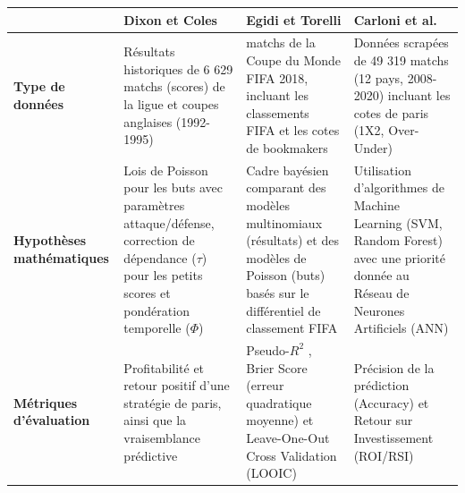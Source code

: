 \begin{landscape}

\begin{tabular}{|L{2cm}||C{5cm}|C{5cm}|C{5cm}|} 
    \hline  & \textbf{Dixon et Coles} &  \textbf{Egidi et Torelli} &  \textbf{Carloni et al.}  \\
    \hline \textbf{Type de données} & Résultats historiques de 6 629 matchs (scores) de la ligue et coupes anglaises (1992-1995) 
    & matchs de la Coupe du Monde FIFA 2018, incluant les classements FIFA et les cotes de bookmakers
    & Données scrapées de 49 319 matchs (12 pays, 2008-2020) incluant les cotes de paris (1X2, Over-Under) \\
    \hline \textbf{Hypothèses mathématiques} & Lois de Poisson pour les buts avec paramètres attaque/défense, 
    correction de dépendance ($\tau$) pour les petits scores et pondération temporelle ($\Phi$)
    & Cadre bayésien comparant des modèles multinomiaux (résultats) et des modèles de Poisson (buts) basés sur le différentiel de classement FIFA
    & Utilisation d'algorithmes de Machine Learning (SVM, Random Forest) avec une priorité donnée au Réseau de Neurones Artificiels (ANN) \\
    \hline \textbf{Métriques d'évaluation} & Profitabilité et retour positif d'une stratégie de paris, ainsi 
    que la vraisemblance prédictive 
    & Pseudo-$R^2$ , Brier Score (erreur quadratique moyenne) et Leave-One-Out Cross Validation (LOOIC)
    & Précision de la prédiction (Accuracy) et Retour sur Investissement (ROI/RSI) \\ 
    \hline 
\end{tabular}

\end{landscape}


